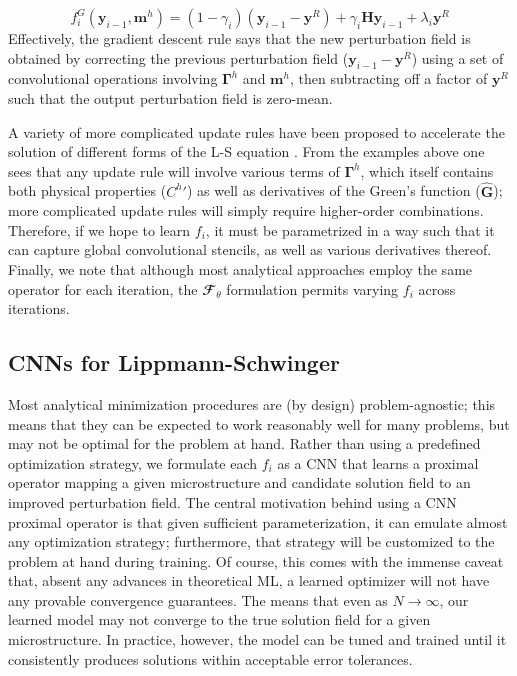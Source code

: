 \documentclass[3p, preprint]{elsarticle}
\newcommand{\bmgam}{\bm{\Gamma}}
\newcommand{\bmm}{\bm{m}}
\newcommand{\bmy}{\bm{y}}
\newcommand{\Gop}{\bm{G}}
\newcommand{\Ghat}{\widehat{\Gop}}
\newcommand{\Htoep}{\bm{H}}
\newcommand{\Ftheta}{\mathbfcal{F}_\theta}
\begin{document}
\begin{equation}
    f_i^{G}(\bmy_{i-1}, \bmm^h) = (1 - \gamma_i)(\bmy_{i-1} - \bmy^R) + \gamma_i\Htoep \bmy_{i-1} + \lambda_i \bmy^R
\end{equation}
\noindent Effectively, the gradient descent rule says that the new perturbation field is obtained by correcting the previous perturbation field ($\bmy_{i-1} - \bmy^R$) using a set of convolutional operations involving $\bmgam^h$ and $\bmm^h$, then subtracting off a factor of $\bmy^R$ such that the output perturbation field is zero-mean.

A variety of more complicated update rules have been proposed to accelerate the solution of different forms of the L-S equation \cite{lebensohn2020}. From the examples above one sees that any update rule will involve various terms of $\bmgam^h$, which itself contains both physical properties (${C^h}'$) as well as derivatives of the Green's function ($\Ghat$); more complicated update rules will simply require higher-order combinations. Therefore, if we hope to learn $f_i$, it must be parametrized in a way such that it can capture global convolutional stencils, as well as various derivatives thereof. Finally, we note that although most analytical approaches employ the same operator for each iteration, the $\Ftheta$ formulation permits varying $f_i$ across iterations. 

\subsection{CNNs for Lippmann-Schwinger}\label{subsec:CNN_method}
Most analytical minimization procedures are (by design) problem-agnostic; this means that they can be expected to work reasonably well for many problems, but may not be optimal for the problem at hand. Rather than using a predefined optimization strategy, we formulate each $f_i$ as a CNN that learns a proximal operator mapping a given microstructure and candidate solution field to an improved perturbation field. The central motivation behind using a CNN proximal operator is that given sufficient parameterization, it can emulate almost any optimization strategy; furthermore, that strategy will be customized to the problem at hand during training. Of course, this comes with the immense caveat that, absent any advances in theoretical ML, a learned optimizer will not have any provable convergence guarantees. The means that even as $N\rightarrow \infty$, our learned model may not converge to the true solution field for a given microstructure. In practice, however, the model can be tuned and trained until it consistently produces solutions within acceptable error tolerances. 
\end{document}
